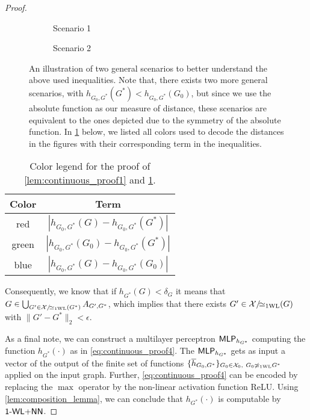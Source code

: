 \begin{proof}
\begin{enumerate}
        \begin{figure}[H]
            \centering
            \begin{subfigure}{0.45\textwidth}
                \centering
                
                \caption{Scenario 1}      
            \end{subfigure}
            \begin{subfigure}{0.45\textwidth}
                \centering
                 
                \caption{Scenario 2}        
            \end{subfigure}
            \caption{An illustration of two general scenarios to better understand the above used inequalities. Note that, there exists two more general scenarios, with $h_{G_0, G^*}(G^*) < h_{G_0, G^*}(G_0)$, but since we use the absolute function as our measure of distance, these scenarios are equivalent to the ones depicted due to the symmetry of the absolute function. In \cref{tab:continuous_proof1} below, we listed all colors used to decode the distances in the figures with their corresponding term in the inequalities.}
            \label{fig:proof_support}
        \end{figure}
        \vspace*{-2pt}
        \begin{table}[H]
            \centering
            \begin{tabular}{ c | c }
                \textbf{Color} & \textbf{Term} \\
                \hline
                red  & $|h_{G_0, G^*}(G) - h_{G_0, G^*}(G^*)|$\\
                green & $|h_{G_0, G^*}(G_0) - h_{G_0, G^*}(G^*)|$\\ 
                blue & $|h_{G_0, G^*}(G) - h_{G_0, G^*}(G_0)|$\\
            \end{tabular}
            \caption{Color legend for the proof of \cref{lem:continuous_proof1} and \cref{fig:proof_support}.}
            \label{tab:continuous_proof1}
        \end{table}
        Consequently, we know that if $h_{G^*}(G) < \delta_G$ it means that $G \in \bigcup_{G' \in \mathcal{X}/\!{\simeq_{\text{1WL}}}(G^*)} A_{G', G^*}$, which implies that there exists $G' \in \mathcal{X}/\!{\simeq_{\text{1WL}}}(G)$ with $\|G' - G^*\|_2 < \epsilon$.
    \end{enumerate}

    As a final note, we can construct a multilayer perceptron $\textsf{MLP}_{h_{G^*}}$ computing the function $h_{G^*}(\cdot)$ as in \cref{eq:continuous_proof4}. The $\textsf{MLP}_{h_{G^*}}$ gets as input a vector of the output of the finite set of functions $\{ \overline{h}_{G_0, G^*}\}_{G_0 \in \mathcal{X}_0, \  G_0 \not \simeq_{\text{1WL}} G^*}$ applied on the input graph. Further, \cref{eq:continuous_proof4} can be encoded by replacing the $\max$ operator by the non-linear activation function ReLU. Using \cref{lem:composition_lemma}, we can conclude that $h_{G^*}(\cdot)$ is computable by $\textsf{1-WL+NN}$.

\end{proof}


